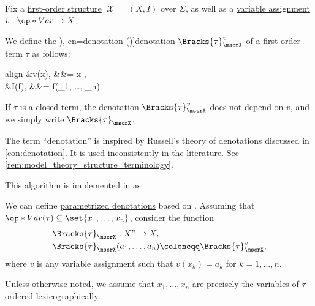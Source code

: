 \begin{algorithm}\label{alg:fol_term_denotation}\mimprovised
  Fix a \hyperref[def:fol_structure]{first-order structure} \( \mscrX = (X, I) \) over \( \Sigma \), as well as a \hyperref[def:fol_variable_assignment]{variable assignment} \( v: \op*{Var} \to X \).

  We define the \term[ru=значение (терма) (\cite[def. 2.2.9]{Герасимов2014Вычислимость}), en=denotation (\cite[91]{Hinman2005Logic})]{denotation} \( \Bracks{\tau}_\mscrX^v \) of a \hyperref[def:fol_term]{first-order term} \( \tau \) as follows:
  \begin{empheq}[left={\Bracks{\varphi}_I} \coloneqq \empheqlbrace]{align}
    &v(x),                                                                                &&\tau = x \in {},                   \label{eq:alg:fol_term_denotation/var} \\
    &I(f), &&\tau = f(\sigma_1, \ldots, \sigma_n). \label{eq:alg:fol_term_denotation/fun}
  \end{empheq}

  If \( \tau \) is a \hyperref[def:fol_closed_term]{closed term}, the \hyperref[alg:fol_formula_denotation]{denotation} \( \Bracks{\tau}_\mscrX^v \) does not depend on \( v \), and we simply write \( \Bracks{\tau}_\mscrX \).
\end{algorithm}
\begin{comments}
  \item The term \enquote{denotation} is inspired by Russell's theory of denotations discussed in \cref{con:denotation}. It is used inconsistently in the literature. See \cref{rem:model_theory_structure_terminology}.

  \item This algorithm is implemented in \cite{notebook:code} as
  \begin{CodeRefDisplay}
  \end{CodeRefDisplay}
\end{comments}

\begin{definition}\label{def:fol_parameterized_term_denotation}
  We can define \hyperref[con:parametrized_denotation]{parametrized denotations} based on . Assuming that \( \op*{Var}(\tau) \subseteq \set{ x_1, \ldots, x_n } \), consider the function
  \begin{equation*}
    \begin{aligned}
      &\Bracks{\tau}_\mscrX: X^n \to X, \\
      &\Bracks{\tau}_\mscrX(a_1, \ldots, a_n) \coloneqq \Bracks{\tau}_\mscrX^v,
    \end{aligned}
  \end{equation*}
  where \( v \) is any variable assignment such that \( v(x_k) = a_k \) for \( k = 1, \ldots, n \).

  Unless otherwise noted, we assume that \( x_1, \ldots, x_n \) are precisely the variables of \( \tau \) ordered lexicographically.
\end{definition}

